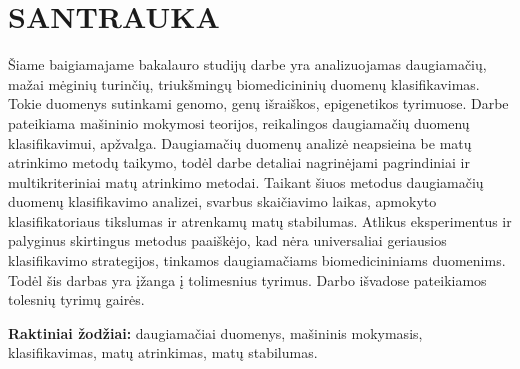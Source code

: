 \section*{SANTRAUKA}
\label{santrauka}

Šiame baigiamajame bakalauro studijų darbe yra analizuojamas daugiamačių, mažai mėginių turinčių, triukšmingų biomedicininių duomenų klasifikavimas. Tokie duomenys sutinkami genomo, genų išraiškos, epigenetikos tyrimuose. Darbe pateikiama mašininio mokymosi teorijos, reikalingos daugiamačių duomenų klasifikavimui, apžvalga. Daugiamačių duomenų analizė neapsieina be matų atrinkimo metodų taikymo, todėl darbe detaliai nagrinėjami pagrindiniai ir multikriteriniai matų atrinkimo metodai. Taikant šiuos metodus daugiamačių duomenų klasifikavimo analizei, svarbus skaičiavimo laikas, apmokyto klasifikatoriaus tikslumas ir atrenkamų matų stabilumas. Atlikus eksperimentus ir palyginus skirtingus metodus paaiškėjo, kad nėra universaliai geriausios klasifikavimo strategijos, tinkamos daugiamačiams biomedicininiams duomenims. Todėl šis darbas yra įžanga į tolimesnius tyrimus. Darbo išvadose pateikiamos tolesnių tyrimų gairės.

\textbf{Raktiniai žodžiai:} daugiamačiai duomenys, mašininis mokymasis, klasifikavimas, matų atrinkimas, matų stabilumas. 